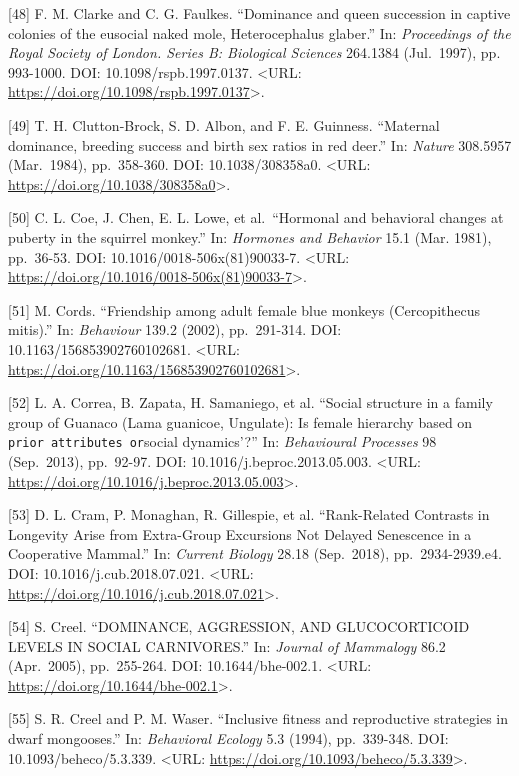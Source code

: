 \documentclass[
]{article}
\begin{document}
{[}48{]} F. M. Clarke and C. G. Faulkes. ``Dominance and queen
succession in captive colonies of the eusocial naked mole\textendashrat,
Heterocephalus glaber.'' In: \emph{Proceedings of the Royal Society of
London. Series B: Biological Sciences} 264.1384 (Jul.~1997), pp.
993-1000. DOI: 10.1098/rspb.1997.0137. \textless URL:
\url{https://doi.org/10.1098/rspb.1997.0137}\textgreater.

{[}49{]} T. H. Clutton-Brock, S. D. Albon, and F. E. Guinness.
``Maternal dominance, breeding success and birth sex ratios in red
deer.'' In: \emph{Nature} 308.5957 (Mar.~1984), pp.~358-360. DOI:
10.1038/308358a0. \textless URL:
\url{https://doi.org/10.1038/308358a0}\textgreater.

{[}50{]} C. L. Coe, J. Chen, E. L. Lowe, et al.~``Hormonal and
behavioral changes at puberty in the squirrel monkey.'' In:
\emph{Hormones and Behavior} 15.1 (Mar. 1981), pp.~36-53. DOI:
10.1016/0018-506x(81)90033-7. \textless URL:
\url{https://doi.org/10.1016/0018-506x(81)90033-7}\textgreater.

{[}51{]} M. Cords. ``Friendship among adult female blue monkeys
(Cercopithecus mitis).'' In: \emph{Behaviour} 139.2 (2002), pp.~291-314.
DOI: 10.1163/156853902760102681. \textless URL:
\url{https://doi.org/10.1163/156853902760102681}\textgreater.

{[}52{]} L. A. Correa, B. Zapata, H. Samaniego, et al. ``Social
structure in a family group of Guanaco (Lama guanicoe, Ungulate): Is
female hierarchy based on
\texttt{prior\ attributes\textquotesingle{}\ or}social dynamics'?'' In:
\emph{Behavioural Processes} 98 (Sep.~2013), pp.~92-97. DOI:
10.1016/j.beproc.2013.05.003. \textless URL:
\url{https://doi.org/10.1016/j.beproc.2013.05.003}\textgreater.

{[}53{]} D. L. Cram, P. Monaghan, R. Gillespie, et al. ``Rank-Related
Contrasts in Longevity Arise from Extra-Group Excursions Not Delayed
Senescence in a Cooperative Mammal.'' In: \emph{Current Biology} 28.18
(Sep.~2018), pp.~2934-2939.e4. DOI: 10.1016/j.cub.2018.07.021.
\textless URL:
\url{https://doi.org/10.1016/j.cub.2018.07.021}\textgreater.

{[}54{]} S. Creel. ``DOMINANCE, AGGRESSION, AND GLUCOCORTICOID LEVELS IN
SOCIAL CARNIVORES.'' In: \emph{Journal of Mammalogy} 86.2 (Apr.~2005),
pp.~255-264. DOI: 10.1644/bhe-002.1. \textless URL:
\url{https://doi.org/10.1644/bhe-002.1}\textgreater.

{[}55{]} S. R. Creel and P. M. Waser. ``Inclusive fitness and
reproductive strategies in dwarf mongooses.'' In: \emph{Behavioral
Ecology} 5.3 (1994), pp.~339-348. DOI: 10.1093/beheco/5.3.339.
\textless URL: \url{https://doi.org/10.1093/beheco/5.3.339}\textgreater.
\end{document}

